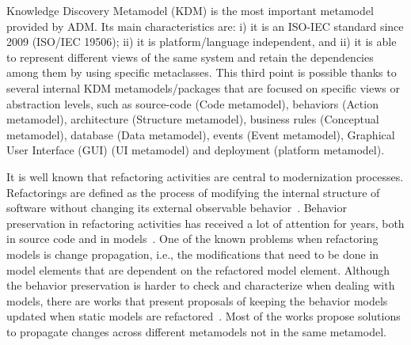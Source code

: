 Knowledge Discovery Metamodel (KDM) is the most important metamodel provided by ADM. Its main characteristics are: i) it is an ISO-IEC standard since 2009 (ISO/IEC 19506); ii) it is platform/language independent, and ii) it is able to represent different views of the same system and retain the dependencies among them by using specific metaclasses. This third point is possible thanks to several internal KDM metamodels/packages that are focused on specific views or abstraction levels, such as  source-code (Code metamodel), behaviors (Action metamodel), architecture (Structure metamodel), business rules (Conceptual metamodel), database (Data metamodel), events (Event metamodel), Graphical User Interface (GUI) (UI metamodel) and deployment (platform metamodel).  

It is well known that refactoring activities are central to modernization processes. Refactorings are defined as the process of modifying the internal structure of software without changing its external observable behavior~\cite{refactImpro}. Behavior preservation in refactoring activities has received a lot of attention for years, both in source code and in models~\cite{4440135, Mens:2006:TMT:1706639.1706924, Mens:2006_NEW, Mens:2007}. One of the known problems when refactoring models is change propagation, i.e., the modifications that need to be done in model elements that are dependent on the refactored model element. Although the behavior preservation is harder to check and characterize when dealing with models, there are works that present proposals of keeping the behavior models updated when static models are refactored~\cite{ICSOFT2014_Winetzhammer}. Most of the works propose solutions to propagate changes across different metamodels not in the same metamodel. 


